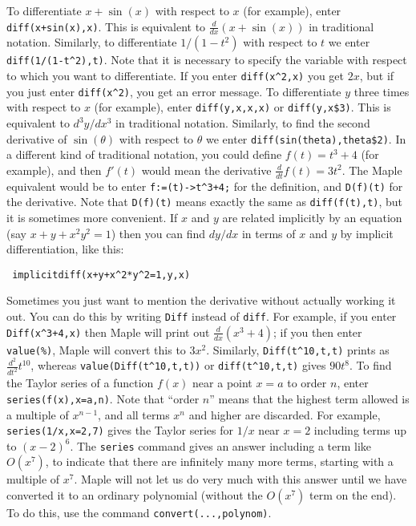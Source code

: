 \documentclass{amsart}
\begin{document}
\begin{itemize}
%
  To differentiate $x+\sin(x)$ with respect to $x$ (for
  example), enter \verb~diff(x+sin(x),x)~.  This is
  equivalent to $\frac{d}{dx}(x+\sin(x))$ in traditional
  notation.  Similarly, to differentiate $1/(1-t^2)$ with
  respect to $t$ we enter \verb~diff(1/(1-t^2),t)~.  
%
  Note that it is necessary to specify the
  variable with respect to which you want to differentiate. 
  If you enter \verb~diff(x^2,x)~ you get $2x$, but if you
  just enter \verb~diff(x^2)~, you get an error message. 
%
  To differentiate $y$ three times with respect to $x$
  (for example), enter \verb~diff(y,x,x,x)~ or
  \verb~diff(y,x$3)~.  This is equivalent to $d^3y/dx^3$ in
  traditional notation.  Similarly, to find the second
  derivative of $\sin(\theta)$ with respect to $\theta$ we
  enter \verb~diff(sin(theta),theta$2)~. 
%
  In a different kind of traditional notation, you
  could define $f(t)=t^3+4$ (for example), and then $f'(t)$
  would mean the derivative $\frac{d}{dt}f(t)=3t^2$.  The
  Maple equivalent would be to enter \verb~f:=(t)->t^3+4;~
  for the definition, and \verb~D(f)(t)~ for the derivative. 
  Note that \verb~D(f)(t)~ means exactly the same as
  \verb~diff(f(t),t)~, but it is sometimes more convenient. 
%
  If $x$ and $y$ are related implicitly
  by an equation (say $x+y+x^2y^2=1$) then you can find
  $dy/dx$ in terms of $x$ and $y$ by implicit
  differentiation, like this: 
\begin{verbatim}
 implicitdiff(x+y+x^2*y^2=1,y,x)
\end{verbatim}
%
  Sometimes you just want to mention the derivative
  without actually working it out.  You can do this by
  writing \verb~Diff~ instead of \verb~diff~.  For example,
  if you enter \verb~Diff(x^3+4,x)~ then Maple will print
  out $\frac{d}{dx}(x^3+4)$; if you then enter
  \verb~value(%)~, Maple will convert this to $3x^2$. 
  Similarly, \verb~Diff(t^10,t,t)~ prints as
  $\frac{d^2}{dt^2}t^{10}$, whereas
  \verb~value(Diff(t^10,t,t))~ or \verb~diff(t^10,t,t)~
  gives $90 t^8$. 
%
  To find the Taylor series of a function $f(x)$ near a
  point $x=a$ to order $n$, enter
  \verb~series(f(x),x=a,n)~.  Note that ``order $n$'' means
  that the highest term allowed is a multiple of $x^{n-1}$,
  and all terms $x^n$ and higher are discarded.  For
  example, \verb~series(1/x,x=2,7)~ gives the Taylor series
  for $1/x$ near $x=2$ including terms up to $(x-2)^6$. 
%
  The \verb~series~ command gives an answer including a term
  like $O(x^7)$,  to indicate that there are
   infinitely many more terms, starting with a multiple of
   $x^{7}$.  Maple will not let us do very much with this
   answer until we have converted it to an ordinary
   polynomial (without the $O(x^7)$ term on the end).  To do
   this, use the command \verb~convert(...,polynom)~. 
\end{itemize}
\end{document}
